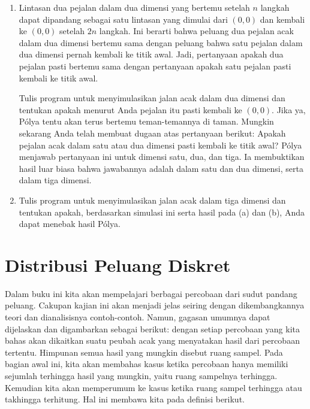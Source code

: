 \begin{LJSItem}
\begin{enumerate}
\item Lintasan dua pejalan dalam dua dimensi yang bertemu setelah $n$ langkah
dapat dipandang sebagai satu lintasan yang dimulai dari $(0,0)$ dan kembali ke
$(0,0)$ setelah $2n$ langkah.  Ini berarti bahwa peluang dua pejalan
acak dalam dua dimensi bertemu sama dengan peluang bahwa satu
pejalan dalam dua dimensi pernah kembali ke titik awal.  Jadi,
pertanyaan apakah dua pejalan pasti bertemu sama dengan pertanyaan
apakah
satu pejalan pasti kembali ke titik awal.

Tulis program untuk menyimulasikan jalan acak dalam dua dimensi dan tentukan apakah menurut Anda
pejalan itu pasti kembali ke $(0,0)$.  Jika ya, P\'olya tentu
akan
terus bertemu teman-temannya di taman.  Mungkin sekarang Anda telah membuat dugaan 
atas pertanyaan berikut: Apakah pejalan acak dalam satu atau dua dimensi pasti
kembali
ke titik awal?  P\'olya menjawab pertanyaan ini untuk dimensi
satu, dua, dan tiga.  Ia membuktikan hasil luar biasa bahwa jawabannya adalah
 dalam satu dan dua dimensi, serta  dalam tiga dimensi.

\item Tulis program untuk menyimulasikan jalan acak dalam tiga dimensi dan tentukan
apakah, berdasarkan simulasi ini serta hasil pada (a) dan (b), 
Anda dapat menebak hasil P\'olya.  
\end{enumerate}

\end{LJSItem}

\section{Distribusi Peluang Diskret}\label{sec 1.2}  

Dalam buku ini kita akan mempelajari berbagai percobaan dari sudut pandang
peluang.  Cakupan kajian ini akan menjadi jelas seiring dengan dikembangkannya
teori dan dianalisisnya contoh-contoh.  Namun, gagasan umumnya dapat
dijelaskan dan digambarkan sebagai berikut: dengan setiap percobaan yang kita bahas
akan dikaitkan suatu peubah acak yang menyatakan hasil dari
percobaan tertentu.  Himpunan semua hasil yang mungkin disebut \emx
{ruang sampel}.  Pada bagian awal ini, kita akan membahas
kasus ketika percobaan hanya memiliki sejumlah terhingga hasil yang mungkin, yaitu ruang sampelnya
terhingga.  Kemudian kita akan memperumum ke kasus ketika ruang sampel terhingga atau
takhingga terhitung.  Hal ini membawa kita pada definisi berikut.

